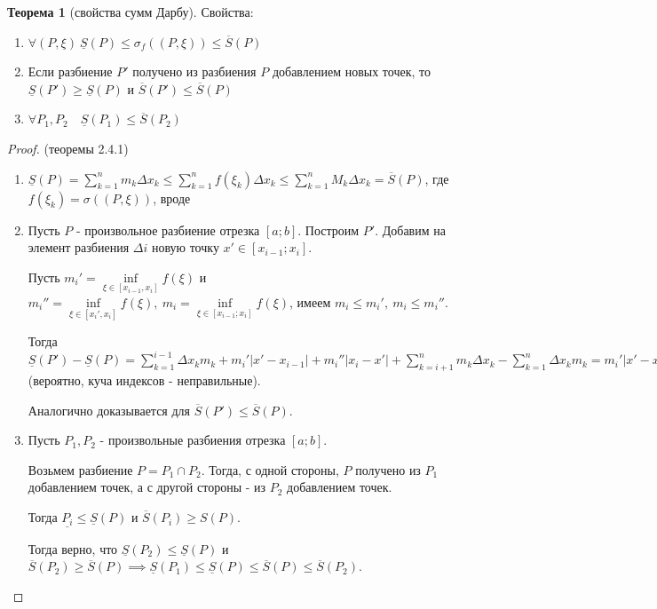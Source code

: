 \documentclass{report}
\theoremstyle{definition}
\newtheorem{theorem}{Теорема}[section]
\begin{document}
\begin{theorem}[свойства сумм Дарбу]
  Свойства:
  \begin{enumerate}
    \item $\forall(P,\xi) \ \underline{S}(P)\leqslant\sigma_{f}((P,\xi))\leqslant\overline{S}(P)$
    \item Если разбиение $P'$ получено из разбиения $P$ добавлением новых точек, то $\underline{S}
            (P') \geqslant \underline{S}(P)$ и $\overline{S}(P')\leqslant\overline{S}(P)$
    \item $\forall P_{1},P_{2} \quad \underline{S}(P_{1})\leqslant\overline{S}(P_{2})$
  \end{enumerate}
\end{theorem}

\begin{proof}
  (теоремы 2.4.1)

  \begin{enumerate}
    \item $\underline{S}(P) = \sum_{k=1}^{n}m_{k}\Delta x_{k} \leqslant \sum_{k=1}^{n}f(\xi_{k})
            \Delta x_{k} \leqslant \sum_{k=1}^{n}M_{k}\Delta x_{k} = \overline{S}(P)$, где $f(\xi_{k}) =
            \sigma((P,\xi))$, вроде
    \item Пусть $P$ - произвольное разбиение отрезка $[a;b]$. Построим $P'$. Добавим на элемент
          разбиения $\Delta i$ новую точку $x'\in [x_{i-1};x_{i}]$.

          Пусть $m_{i}' = \underset{\xi\in[x_{i-1},x_{i}]}{\inf}f(\xi)$ и $m_{i}'' = \underset
            {\xi\in[x_{i}',x_{i}]}{\inf}f(\xi), \ m_{i} = \underset{\xi\in[x_{i-1};x_{i}]}{\inf}f(\xi)$,
          имеем $m_{i}\leqslant m_{i}', \ m_{i} \leqslant m_{i}''$.

          Тогда $\underline{S}(P') - \underline{S}(P) = \sum_{k=1}^{i-1}\Delta x_{k}m_{k} +
            m_{i}' | x' - x_{i-1} | + m_{i}''| x_{i} - x' | + \sum_{k=i+1}^{n}m_{k}\Delta x_{k} - \sum_{k=1}^{n}
            \Delta x_{k}m_{k} = m_{i}'| x' - x_{i-1} | + m_{i}''| x_{i} - x' | - m_{i}\Delta x_{i} \geqslant 0
            \implies \underline{S}(P') \geqslant S(P)$ (вероятно, куча индексов - неправильные).

          Аналогично доказывается для $\overline{S}(P')\leqslant\overline{S}(P)$.
    \item Пусть $P_{1},P_{2}$ - произвольные разбиения отрезка $[a;b]$.

          Возьмем разбиение $P = P_{1}\cap P_{2}$. Тогда, с одной стороны, $P$ получено из $P_{1}$ добавлением
          точек, а с другой стороны - из $P_{2}$ добавлением точек.

          Тогда $\underline{P_{i}} \leqslant \underline{S}(P)$ и $\overline{S}(P_{i})\geqslant S(P)$.

          Тогда верно, что $\underline{S}(P_{2})\leqslant \underline{S}(P)$ и $\overline{S}(P_{2})
            \geqslant \overline{S}(P) \implies \underline{S}(P_{1}) \leqslant \underline{S}(P) \leqslant
            \overline{S}(P)\leqslant \overline{S}(P_{2})$.
  \end{enumerate}
\end{proof}
\end{document}

